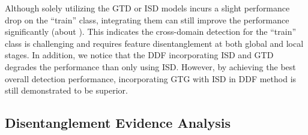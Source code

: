 \documentclass[journal]{IEEEtran}
\begin{document}
Although solely utilizing the GTD or ISD models incurs a slight performance drop on the ``train'' class, integrating them can still improve the performance significantly (about ). This indicates the cross-domain detection for the ``train'' class is challenging and requires feature disentanglement at both global and local stages. In addition, we notice that the DDF incorporating ISD and GTD degrades the performance than only using ISD. However, by achieving the best overall detection performance, incorporating GTG with ISD in DDF method is still demonstrated to be superior.

{}


\begin{table}[!htb]
\centering
\caption{Quantitative evaluation on the domain distance under the Cityscapes  Foggy Cityscapes setting. G and I represent the features at the global and local levels, respectively.}
\label{table-cmp-distance}
\end{table}





\subsection{Disentanglement Evidence Analysis}
\end{document}
